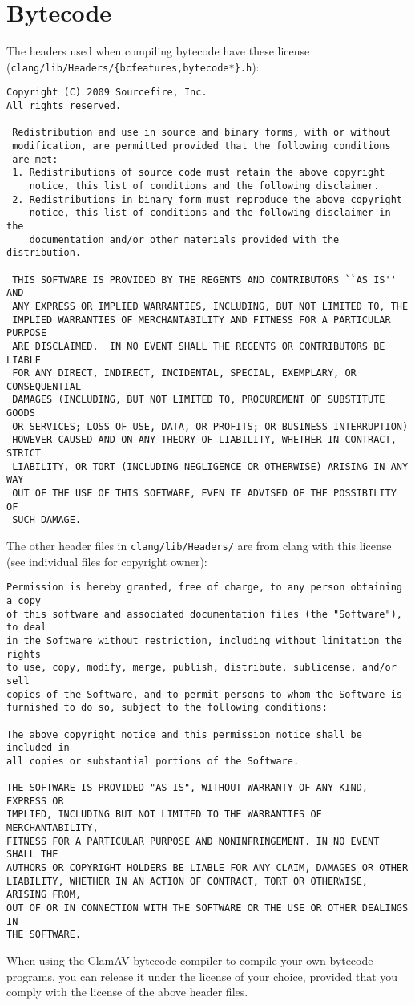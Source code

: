 \section{Bytecode}
The headers used when compiling bytecode have these license (\verb+clang/lib/Headers/{bcfeatures,bytecode*}.h+):
{\footnotesize
\begin{verbatim}
Copyright (C) 2009 Sourcefire, Inc.
All rights reserved.

 Redistribution and use in source and binary forms, with or without
 modification, are permitted provided that the following conditions
 are met:
 1. Redistributions of source code must retain the above copyright
    notice, this list of conditions and the following disclaimer.
 2. Redistributions in binary form must reproduce the above copyright
    notice, this list of conditions and the following disclaimer in the
    documentation and/or other materials provided with the distribution.

 THIS SOFTWARE IS PROVIDED BY THE REGENTS AND CONTRIBUTORS ``AS IS'' AND
 ANY EXPRESS OR IMPLIED WARRANTIES, INCLUDING, BUT NOT LIMITED TO, THE
 IMPLIED WARRANTIES OF MERCHANTABILITY AND FITNESS FOR A PARTICULAR PURPOSE
 ARE DISCLAIMED.  IN NO EVENT SHALL THE REGENTS OR CONTRIBUTORS BE LIABLE
 FOR ANY DIRECT, INDIRECT, INCIDENTAL, SPECIAL, EXEMPLARY, OR CONSEQUENTIAL
 DAMAGES (INCLUDING, BUT NOT LIMITED TO, PROCUREMENT OF SUBSTITUTE GOODS
 OR SERVICES; LOSS OF USE, DATA, OR PROFITS; OR BUSINESS INTERRUPTION)
 HOWEVER CAUSED AND ON ANY THEORY OF LIABILITY, WHETHER IN CONTRACT, STRICT
 LIABILITY, OR TORT (INCLUDING NEGLIGENCE OR OTHERWISE) ARISING IN ANY WAY
 OUT OF THE USE OF THIS SOFTWARE, EVEN IF ADVISED OF THE POSSIBILITY OF
 SUCH DAMAGE.
\end{verbatim}
}

The other header files in \verb+clang/lib/Headers/+ are from clang with this license
(see individual files for copyright owner):
{\footnotesize
\begin{verbatim}
Permission is hereby granted, free of charge, to any person obtaining a copy
of this software and associated documentation files (the "Software"), to deal
in the Software without restriction, including without limitation the rights
to use, copy, modify, merge, publish, distribute, sublicense, and/or sell
copies of the Software, and to permit persons to whom the Software is
furnished to do so, subject to the following conditions:

The above copyright notice and this permission notice shall be included in
all copies or substantial portions of the Software.

THE SOFTWARE IS PROVIDED "AS IS", WITHOUT WARRANTY OF ANY KIND, EXPRESS OR
IMPLIED, INCLUDING BUT NOT LIMITED TO THE WARRANTIES OF MERCHANTABILITY,
FITNESS FOR A PARTICULAR PURPOSE AND NONINFRINGEMENT. IN NO EVENT SHALL THE
AUTHORS OR COPYRIGHT HOLDERS BE LIABLE FOR ANY CLAIM, DAMAGES OR OTHER
LIABILITY, WHETHER IN AN ACTION OF CONTRACT, TORT OR OTHERWISE, ARISING FROM,
OUT OF OR IN CONNECTION WITH THE SOFTWARE OR THE USE OR OTHER DEALINGS IN
THE SOFTWARE.
\end{verbatim}
}

When using the ClamAV bytecode compiler to compile your own bytecode programs, you can release it under the license of your choice,
provided that you comply with the license of the above header files.

